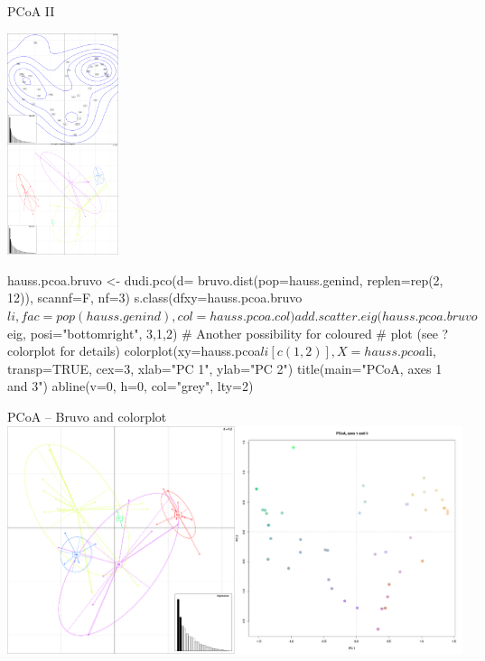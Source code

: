 \documentclass[compress, ucs, xelatex, 11pt, xcolor=svgnames,
  hyperref={
    bookmarks=true,
    unicode=true,
    colorlinks=true,
    pdftitle={Molecular data in R},
    plainpages=false,
    pdfauthor={Vojtech Zeisek},
    pdfsubject={Course about phylogeny and evolution in R},
    pdfcreator={XeLaTeX},
    pdfkeywords={R, evolution, phylogeny, molecular data},
    linkcolor=Tomato,
    anchorcolor=SaddleBrown,
    citecolor=Goldenrod,
    filecolor=DarkMagenta,
    menucolor=Sienna,
    urlcolor=DarkTurquoise,
    pdftex},
  url={hyphens, lowtilde} %
  ]{beamer}
\begin{document}
\begin{frame}[fragile]{PCoA II}
\begin{multicols}{2}
  \begin{center}
    \includegraphics[height=6.5cm]{pcoa.png}
  \end{center}
  \columnbreak
  \begin{spluscode}
    hauss.pcoa.bruvo <- dudi.pco(d=	
      bruvo.dist(pop=hauss.genind,
      replen=rep(2, 12)), scannf=F,
      nf=3)
    s.class(dfxy=hauss.pcoa.bruvo$li,
      fac=pop(hauss.genind),
      col=hauss.pcoa.col)
    add.scatter.eig(hauss.pcoa.bruvo$
      eig, posi="bottomright", 3,1,2)
    # Another possibility for coloured
    # plot (see ?colorplot for details)
    colorplot(xy=hauss.pcoa$li[c(1, 2)],
      X=hauss.pcoa$li, transp=TRUE,
      cex=3, xlab="PC 1", ylab="PC 2")
    title(main="PCoA, axes 1 and 3")
    abline(v=0, h=0, col="grey", lty=2)
  \end{spluscode}
\end{multicols}
\end{frame}

\begin{frame}{PCoA -- Bruvo and colorplot}
  \includegraphics[width=\textwidth]{pcoa-dalsi.png}
\end{frame}
\end{document}
